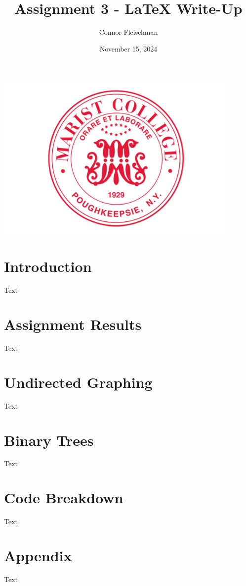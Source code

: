 \documentclass[12pt, letterpaper]{article}
\title{Assignment 3 - LaTeX Write-Up}
\author{Connor Fleischman}
\date{November 15, 2024}
\begin{document}
\maketitle
\begin{center}
   \includegraphics[width=120mm,scale=0.5]{MaristSeal.png}
\end{center}
\newpage

\tableofcontents
\newpage

\section{Introduction}
Text

\section{Assignment Results}
Text

\section{Undirected Graphing}
Text

\section{Binary Trees}
Text

\section{Code Breakdown}
Text

\appendix
\section{Appendix}
Text
\end{document}
